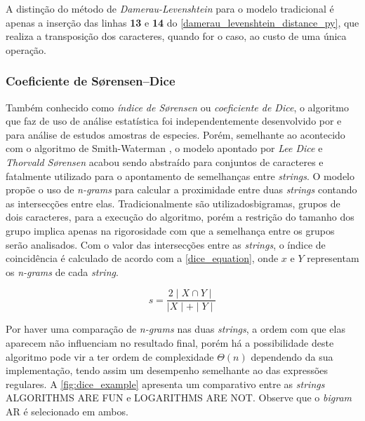 A distinção do método de \textit{Damerau-Levenshtein} para o modelo tradicional é apenas a inserção das linhas \textbf{13} e \textbf{14} do \autoref{damerau_levenshtein_distance_py}, que realiza a transposição dos caracteres, quando for o caso, ao custo de uma única operação.

\subsubsection*{Coeficiente de Sørensen–Dice} %
\label{ssub:s_rensen_dice_coefficient}

Também conhecido como \textit{índice de Sørensen} ou \textit{coeficiente de Dice}, o algoritmo que faz de uso de análise estatística foi independentemente desenvolvido por  e  para análise  de estudos amostras de especies. Porém, semelhante ao acontecido com o algoritmo de Smith-Waterman \cite{smith1981identification}, o modelo apontado por \textit{Lee Dice} e \textit{Thorvald Sørensen} acabou sendo abstraído para conjuntos de caracteres e fatalmente utilizado para o apontamento de semelhanças entre \textit{strings}. O modelo propõe o uso de \textit{n-grams} \cite{cavnar1994n} para calcular a proximidade entre duas \textit{strings} contando as intersecções entre elas. Tradicionalmente são utilizadosbigramas, grupos de dois caracteres, para a execução do algoritmo, porém a restrição do tamanho dos grupo implica apenas na rigorosidade com que a semelhança entre os grupos serão analisados. Com o valor das intersecções entre as \textit{strings}, o índice de coincidência é calculado de acordo com a \autoref{dice_equation}, onde $x$ e $Y$ representam os \textit{n-grams} de cada \textit{string}.

\begin{equation}\label{dice_equation}
  s = \frac{2\mid X\cap Y\mid}{\mid X\mid+\mid Y\mid}
\end{equation}

Por haver uma comparação de \textit{n-grams} nas duas \textit{strings}, a ordem com que elas aparecem não influenciam no resultado final, porém  há a possibilidade deste algoritmo pode vir a ter ordem de complexidade $\Theta(n)$ dependendo da sua implementação, tendo assim um desempenho semelhante ao das expressões regulares. A \autoref{fig:dice_example} apresenta um comparativo entre as \textit{strings} {\code ALGORITHMS ARE FUN} e {\code LOGARITHMS ARE NOT}. Observe que o \textit{bigram} {\code AR} é selecionado em ambos.

